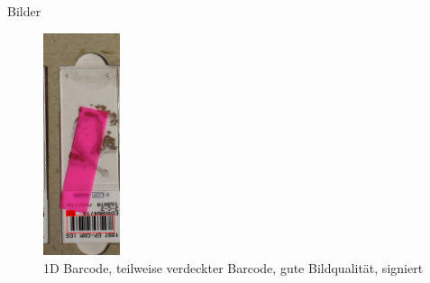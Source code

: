 \documentclass{beamer}
\begin{document}
\begin{frame}{Bilder}
\begin{figure}
      \hfill
      \includegraphics[width=0.2\textwidth]{./assets/Cell104473_2_4_top1_prosconsminweight.PNG}
      \caption{1D Barcode, teilweise verdeckter Barcode, gute Bildqualität, signiert}
    \end{figure}
  \end{frame}
\end{document}
